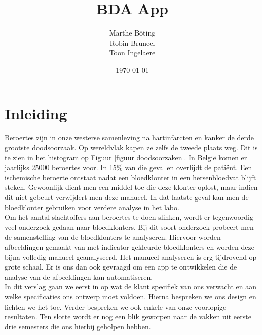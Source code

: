 \documentclass[a4paper,kulak]{kulakarticle}
\date{\today}
\title{BDA App}
\author{Marthe B\"{o}ting\\
	Robin Bruneel\\
	Toon Ingelaere}
\begin{document}
	
	\newpage
	
	\maketitle
	\newline
	\newline
	\newline
	\newline
	\newline
	\newline
	\section*{Inleiding}
		Beroertes zijn in onze westerse samenleving na hartinfarcten en kanker de derde grootste doodsoorzaak. Op wereldvlak kapen ze zelfs de tweede plaats weg. Dit is te zien in het histogram op Figuur \ref{figuur doodsoorzaken}. In België komen er jaarlijks 25000 beroertes voor. In 15\% van die gevallen overlijdt de patiënt. Een ischemische beroerte ontstaat nadat een bloedklonter in een hersenbloedvat blijft steken.
		Gewoonlijk dient men een middel toe die deze klonter oplost, maar indien dit niet gebeurt verwijdert men deze manueel. In dat laatste geval kan men de bloedklonter gebruiken voor verdere analyse in het labo.\\
		Om het aantal slachtoffers aan beroertes te doen slinken, wordt er tegenwoordig veel onderzoek gedaan naar bloedklonters. Bij dit soort onderzoek probeert men de samenstelling van de bloedklonters te analyseren. Hiervoor worden afbeeldingen gemaakt van met indicator gekleurde bloedklonters en worden deze bijna volledig manueel geanalyseerd. Het manueel analyseren is erg tijdrovend op grote schaal. Er is ons dan ook gevraagd om een app te ontwikkelen die de analyse van de afbeeldingen kan automatiseren.\\
		In dit verslag gaan we eerst in op wat de klant specifiek van ons verwacht en aan welke specificaties ons ontwerp moet voldoen. Hierna bespreken we ons design en lichten we het toe. Verder bespreken we ook enkele van onze voorlopige resultaten. Ten slotte wordt er nog een blik geworpen naar de vakken uit eerste drie semesters die ons hierbij geholpen hebben.
\end{document}
